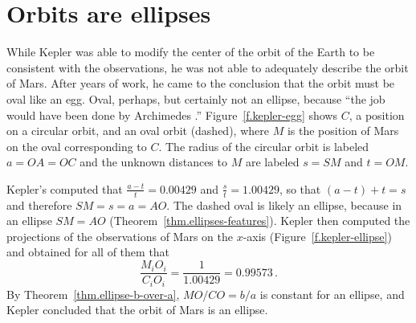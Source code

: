 
\section{Orbits are ellipses}

While Kepler was able to modify the center of the orbit of the Earth to be consistent with the observations, he was not able to adequately describe the orbit of Mars. After years of work, he came to the conclusion that the orbit must be oval like an egg. Oval, perhaps, but certainly not an ellipse, because ``the job would have been done by Archimedes \cite[p.~94]{hahn-cic}.'' Figure~\ref{f.kepler-egg} shows $C$, a position on a circular orbit, and an oval orbit (dashed), where $M$ is the position of Mars on the oval corresponding to $C$. The radius of the circular orbit is labeled $a=OA=OC$ and the unknown distances to $M$ are labeled $s=SM$ and $t=OM$.

Kepler's computed that $\frac{a-t}{t} = 0.00429$ and $\frac{s}{t} = 1.00429$, so that $(a-t)+t=s$
and therefore $SM=s=a=AO$. The dashed oval is likely an ellipse, because in an ellipse $SM=AO$ (Theorem~\ref{thm.ellipses-features}). Kepler then computed the projections of the observations of Mars on the $x$-axis (Figure~\ref{f.kepler-ellipse}) and obtained for all of them that
\[
\frac{M_iO_i}{C_iO_i} = \frac{1}{1.00429}=0.99573\,.
\]
By Theorem~\ref{thm.ellipse-b-over-a}, $MO/CO=b/a$ is constant for an ellipse, and Kepler concluded that the orbit of Mars is an ellipse.


